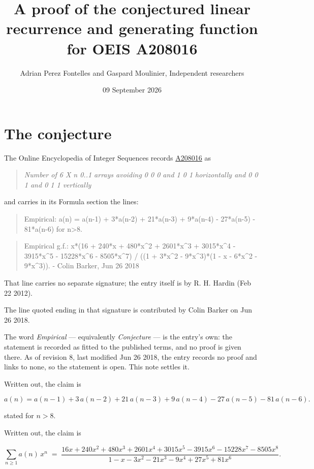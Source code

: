 \documentclass[11pt]{article}
\title{A proof of the conjectured linear recurrence and generating function for OEIS A208016}
\author{Adrian Perez Fontelles and Gaspard Moulinier, Independent researchers}
\date{09 September 2026}
\theoremstyle{definition}
\begin{document}
\maketitle
\section{The conjecture}

The Online Encyclopedia of Integer Sequences records \href{https://oeis.org/A208016}{A208016} as

\begin{quote}\itshape Number of 6 X n 0..1 arrays avoiding 0 0 0 and 1 0 1 horizontally and 0 0 1 and 0 1 1 vertically\end{quote}

and carries in its Formula section the lines:

\begin{quote}\ttfamily Empirical: a(n) = a(n-1) + 3*a(n-2) + 21*a(n-3) + 9*a(n-4) - 27*a(n-5) - 81*a(n-6) for n>8.\end{quote}

\begin{quote}\ttfamily Empirical g.f.: x*(16 + 240*x + 480*x\textasciicircum{}2 + 2601*x\textasciicircum{}3 + 3015*x\textasciicircum{}4 - 3915*x\textasciicircum{}5 - 15228*x\textasciicircum{}6 - 8505*x\textasciicircum{}7) / ((1 + 3*x\textasciicircum{}2 - 9*x\textasciicircum{}3)*(1 - x - 6*x\textasciicircum{}2 - 9*x\textasciicircum{}3)). - Colin Barker, Jun 26 2018\end{quote}

That line carries no separate signature; the entry itself is by R. H. Hardin (Feb 22 2012).

The line quoted ending in that signature is contributed by Colin Barker on Jun 26 2018.

The word {\itshape Empirical} --- equivalently {\itshape Conjecture} --- is the entry's own: the statement is recorded as fitted to the published terms, and no proof is given there. As of revision 8, last modified Jun 26 2018, the entry records no proof and links to none, so the statement is open. This note settles it.

Written out, the claim is

\[a(n) = a(n-1) + 3\,a(n-2) + 21\,a(n-3) + 9\,a(n-4) - 27\,a(n-5) - 81\,a(n-6).\]

stated for $n > 8$.

Written out, the claim is

\[\sum_{n \ge 1} a(n)\,x^n \;=\; \frac{16x + 240x^{2} + 480x^{3} + 2601x^{4} + 3015x^{5} - 3915x^{6} - 15228x^{7} - 8505x^{8}}{1 - x - 3x^{2} - 21x^{3} - 9x^{4} + 27x^{5} + 81x^{6}}.\]
\end{document}
